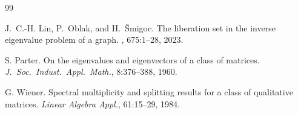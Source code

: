 \documentclass{article}
\theoremstyle{definition}
\begin{document}
\begin{thebibliography}{99}

J.~C.-H. Lin, P.~Oblak, and H.~\v{S}migoc.
\newblock The liberation set in the inverse eigenvalue problem of a graph.
, 675:1--28, 2023.

S. Parter. 
\newblock On the eigenvalues and eigenvectors of a class of matrices. 
\newblock \emph{J.\ Soc.\ Indust.\ Appl.\ Math.}, 8:376--388, 1960.

G. Wiener. 
\newblock Spectral multiplicity and splitting results for a class of qualitative matrices.
\newblock \emph{Linear Algebra Appl.}, 61:15--29, 1984.
\end{thebibliography}
\end{document}
